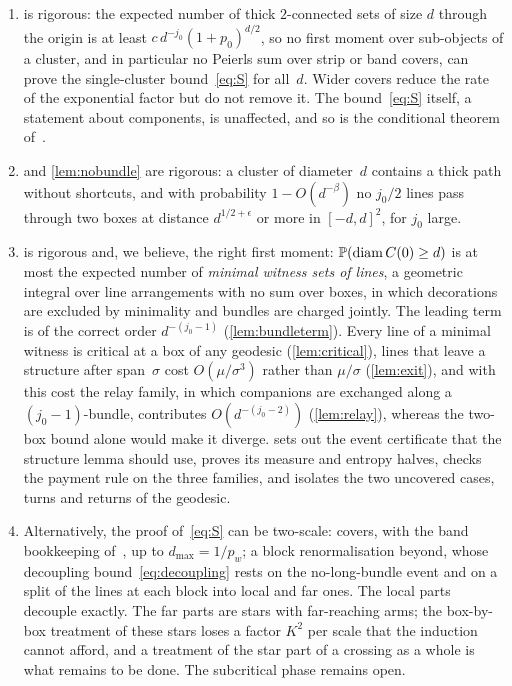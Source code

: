 \documentclass[11pt,letterpaper]{article}
\DeclareMathOperator{\diam}{diam}
\begin{document}
\begin{enumerate}
  \item {} is rigorous: the expected number of thick $2$-connected sets of size $d$ through the origin is at least $c\,d^{-j_0}(1+p_0)^{d/2}$, so no first moment over sub-objects of a cluster, and in particular no Peierls sum over strip or band covers, can prove the single-cluster bound~\eqref{eq:S} for all~$d$. Wider covers reduce the rate of the exponential factor but do not remove it. The bound~\eqref{eq:S} itself, a statement about components, is unaffected, and so is the conditional theorem of~\cite{FM26}.
  \item {} and \cref{lem:nobundle} are rigorous: a cluster of diameter~$d$ contains a thick path without shortcuts, and with probability $1-O(d^{-\beta})$ no $j_0/2$ lines pass through two boxes at distance $d^{1/2+\epsilon}$ or more in $[-d,d]^2$, for $j_0$ large.
  \item {} is rigorous and, we believe, the right first moment: $\P(\diam C(0)\ge d)$ is at most the expected number of \emph{minimal witness sets of lines}, a geometric integral over line arrangements with no sum over boxes, in which decorations are excluded by minimality and bundles are charged jointly. The leading term is of the correct order $d^{-(j_0-1)}$ (\cref{lem:bundleterm}). Every line of a minimal witness is critical at a box of any geodesic (\cref{lem:critical}), lines that leave a structure after span~$\sigma$ cost $O(\mu/\sigma^3)$ rather than $\mu/\sigma$ (\cref{lem:exit}), and with this cost the relay family, in which companions are exchanged along a $(j_0-1)$-bundle, contributes $O(d^{-(j_0-2)})$ (\cref{lem:relay}), whereas the two-box bound alone would make it diverge.  sets out the event certificate that the structure lemma should use, proves its measure and entropy halves, checks the payment rule on the three families, and isolates the two uncovered cases, turns and returns of the geodesic.
  \item Alternatively, the proof of~\eqref{eq:S} can be two-scale: covers, with the band bookkeeping of~\cite{PS26}, up to $d_{\max}=1/p_w$; a block renormalisation beyond, whose decoupling bound~\eqref{eq:decoupling} rests on the no-long-bundle event and on a split of the lines at each block into local and far ones. The local parts decouple exactly. The far parts are stars with far-reaching arms; the box-by-box treatment of these stars loses a factor $K^2$ per scale that the induction cannot afford, and a treatment of the star part of a crossing as a whole is what remains to be done. The subcritical phase remains open.
\end{enumerate}
\end{document}
